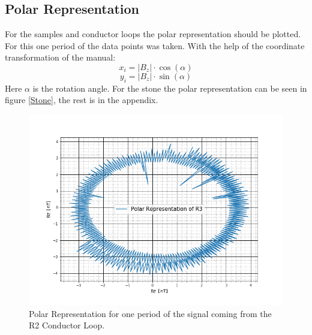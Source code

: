 \subsection{Polar Representation}
For the samples and conductor loops the polar representation should be plotted. For this one period of the data points was taken. With the help of the coordinate transformation of the manual\cite{anleitung}:
\begin{equation}
	x_i=|B_z|\cdot \cos(\alpha)
\end{equation}
\begin{equation}
	y_i=|B_z|\cdot \sin(\alpha)
\end{equation}
Here $\alpha$ is the rotation angle. For the stone the polar representation can be seen in figure \ref{Stone}, the rest is in the appendix.
\begin{figure}[ht]
	\includegraphics[scale=0.5]{Bild/R3}
	\centering
	\caption[Polar Representation for R2 Conductor Loop]{Polar Representation for one period of the signal coming from the R2 Conductor Loop.}
\end{figure}\\